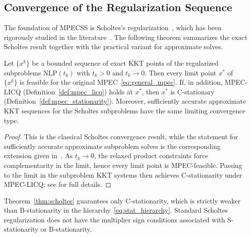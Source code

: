 
\subsection{Convergence of the Regularization Sequence}
\label{sec:conv_reg_seq}

The foundation of MPECSS is Scholtes's regularization~\cite{Scholtes2001}, which has been rigorously studied in the
literature~\cite{HoheiselKanzowSchwartz2013,RalphWright2004,SteffensenUlbrich2010}. The following theorem summarizes the exact Scholtes result together with the practical variant for approximate solves.

\begin{theorem}
\label{thm:scholtes}
Let $\{x^k\}$ be a bounded sequence of exact KKT points of the
regularized subproblems $\text{NLP}(t_k)$ with $t_k > 0$ and
$t_k \to 0$. Then every limit point $x^*$ of $\{x^k\}$ is
feasible for the original MPEC~\eqref{eq:general_mpec}. If, in
addition, MPEC-LICQ (Definition~\ref{def:mpec_licq}) holds at $x^*$,
then $x^*$ is C-stationary (Definition~\ref{def:mpec_stationarity}).
Moreover, sufficiently accurate approximate KKT sequences for the
Scholtes subproblems have the same limiting convergence type.
\end{theorem}

\begin{proof}
This is the classical Scholtes convergence result, while the statement
for sufficiently accurate approximate subproblem solves is the corresponding
extension given in~\cite{KanzowSchwartz2015}. As $t_k \to 0$, the
relaxed product constraints force complementarity in the limit, hence
every limit point is MPEC-feasible. Passing to the limit in the
subproblem KKT systems then achieves C-stationarity under MPEC-LICQ; see
\cite{Scholtes2001,KanzowSchwartz2015} for full details.
\end{proof}

Theorem~\ref{thm:scholtes} guarantees only C-stationarity, which is
strictly weaker than B-stationarity in the
hierarchy~\eqref{eq:stat_hierarchy}. Standard Scholtes regularization
does not have the multiplier sign conditions associated
with S-stationarity or B-stationarity.

